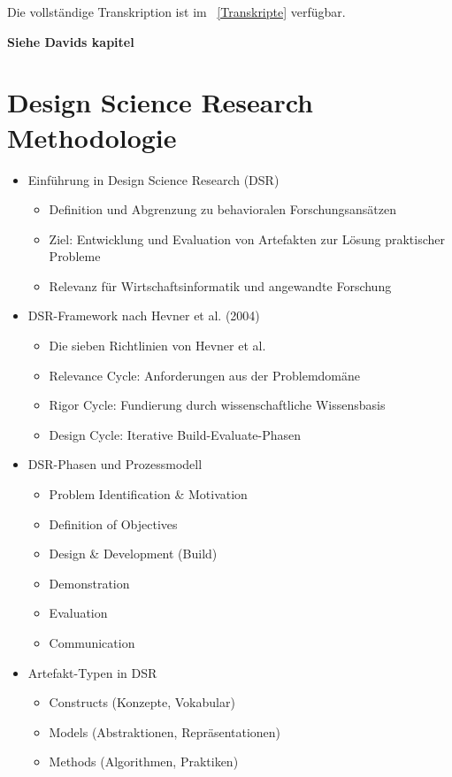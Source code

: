 Die vollständige Transkription ist im ~\ref{Transkripte} verfügbar.


\textbf{Siehe Davids kapitel}



\section{Design Science Research Methodologie}
\begin{itemize}
  \item Einführung in Design Science Research (DSR)
  \begin{itemize}
    \item Definition und Abgrenzung zu behavioralen Forschungsansätzen
    \item Ziel: Entwicklung und Evaluation von Artefakten zur Lösung praktischer Probleme
    \item Relevanz für Wirtschaftsinformatik und angewandte Forschung
  \end{itemize}
  \item DSR-Framework nach Hevner et al. (2004)
  \begin{itemize}
    \item Die sieben Richtlinien von Hevner et al.
    \item Relevance Cycle: Anforderungen aus der Problemdomäne
    \item Rigor Cycle: Fundierung durch wissenschaftliche Wissensbasis
    \item Design Cycle: Iterative Build-Evaluate-Phasen
  \end{itemize}
  \item DSR-Phasen und Prozessmodell
  \begin{itemize}
    \item Problem Identification \& Motivation
    \item Definition of Objectives
    \item Design \& Development (Build)
    \item Demonstration
    \item Evaluation
    \item Communication
  \end{itemize}
  \item Artefakt-Typen in DSR
  \begin{itemize}
    \item Constructs (Konzepte, Vokabular)
    \item Models (Abstraktionen, Repräsentationen)
    \item Methods (Algorithmen, Praktiken)

\end{itemize}
\end{itemize}
